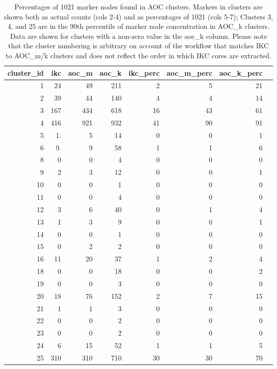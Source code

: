\documentclass[12pt, oneside]{article}   	%
\begin{document}
\begin{table}[ht]
\centering
\caption{Percentages of 1021 marker nodes found in AOC clusters. Markers in clusters are shown both as actual counts (cols 2-4) and as percentages of 1021 (cols 5-7); Clusters 3, 4, and 25 are in the 90th percentile of marker node concentration in AOC\_k clusters. Data are shown for clusters with a non-zero value in the aoc\_k column. Please note that the cluster numbering is arbitrary on account of the workflow that matches IKC to AOC\_m/k clusters and does not reflect the order in which IKC cores are extracted. }
\begin{tabular}{rrrrrrrr}
  \hline
cluster\_id & ikc & aoc\_m & aoc\_k & ikc\_perc & aoc\_m\_perc & aoc\_k\_perc \\ 
  \hline
1 & 24 &  49 & 211 &   2 &   5 &  21 \\ 
2 & 39 &  44 & 140 &   4 &   4 &  14 \\ 
3 & 167 & 434 & 618 &  16 &  43 &  61 \\ 
4 & 416 & 921 & 932 &  41 &  90 &  91 \\ 
5 & 1. &   5 &  14 &   0 &   0 &   1 \\ 
6 & 9. &   9 &  58 &   1 &   1 &   6 \\ 
8 & 0 &   0 &   4 &   0 &   0 &   0 \\ 
9 & 2 &   3 &  12 &   0 &   0 &   1 \\ 
10 & 0 &   0 &   1 &   0 &   0 &   0 \\ 
11 & 0 &   0 &   4 &   0 &   0 &   0 \\ 
12 & 3 &   6 &  40 &   0 &   1 &   4 \\ 
13 & 1 &   3 &   9 &   0 &   0 &   1 \\ 
14 & 0 &   0 &   1 &   0 &   0 &   0 \\ 
15 & 0 &   2 &   2 &   0 &   0 &   0 \\ 
16 & 11 &  20 &  37 &   1 &   2 &   4 \\ 
18 & 0 &   0 &  18 &   0 &   0 &   2 \\ 
19 & 0 &   0 &   3 &   0 &   0 &   0 \\ 
20 & 18 &  76 & 152 &   2 &   7 &  15 \\ 
21 & 1 &   1 &   3 &   0 &   0 &   0 \\ 
22 & 0 &   0 &   2 &   0 &   0 &   0 \\ 
23 & 0 &   0 &   2 &   0 &   0 &   0 \\ 
24 & 6 &  15 &  52 &   1 &   1 &   5 \\ 
25 & 310 & 310 & 710 &  30 &  30 &  70 \\ 

\end{tabular}
\end{table}
\end{document}
